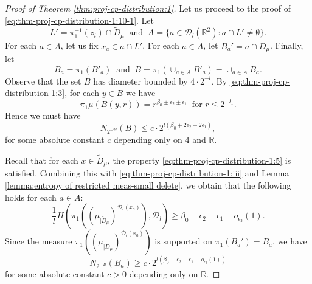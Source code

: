 \documentclass[10pt,a4paper]{amsart}
\def\D{\mathcal{D}}
\def\R{\mathbb R}
\begin{document}
\begin{proof}[Proof of Theorem \ref{thm:proj-cp-distribution:1}]
Let us proceed to the proof of \eqref{eq:thm-proj-cp-distribution-1:10-1}. Let 
\[L'=\pi_1^{-1}(z_i)\cap \tilde{D}_\mu\ \textrm{ and } \ A=\{a\in \D_l(\R^2): a\cap L'\neq \emptyset\}.\]
For each $a\in A$, let us fix $x_a\in a\cap L'$.   For each $a\in A$, let $B_a'=a\cap \tilde{D}_\mu$.  Finally, let 
\[B_a=\pi_1 (B'_a) \ \textrm{ and } \  B=\pi_1(\cup_{a\in A}B'_a)=\cup_{a\in A}B_a.\]
Observe that the set $B$ has diameter bounded by $4\cdot 2^{-l}$.  By  \eqref{eq:thm-proj-cp-distribution-1:3},  for each $y\in B$ we have
\[
\pi_1\mu(B(y,  r)) = r^{\beta_0\pm\epsilon_2\pm\epsilon_1} \  \textrm{ for } r\le 2^{-l_1}.
\]
Hence we must have 
\begin{equation}\label{eq:thm-proj-cp-distribution-1:11}
N_{2^{-2l}}(B) \le  c \cdot  2^{l(\beta_0+2\epsilon_2+2 \epsilon_1)},
\end{equation}
for some absolute constant $c$ depending only on $4$ and $\R$.  

Recall that for each $x\in \tilde{D}_\mu$,  the property \eqref{eq:thm-proj-cp-distribution-1:5} is satisfied.  Combining this with  \eqref{eq:thm-proj-cp-distribution-1:iii} and Lemma \ref{lemma:entropy of restricted meas-small delete},  we obtain that the following holds for each $a\in A$:
\[
\frac{1}{l}H\left(\pi_1\left(\left(\mu_{|\tilde{D}_\mu}\right)^{\D_l(x_a)}\right),  \D_l\right)\ge \beta_0-\epsilon_2- \epsilon_1-o_{\epsilon_3}(1). 
\]
Since the measure $\pi_1\left(\left(\mu_{|\tilde{D}_\mu}\right)^{\D_l(x_a)}\right)$ is supported on $\pi_1(B_a')=B_a$, we have
\begin{equation}\label{eq:thm-proj-cp-distribution-1:12}
N_{2^{-2l}}(B_a) \ge   c \cdot  2^{l(\beta_0-\epsilon_2- \epsilon_1-o_{\epsilon_3}(1))}
\end{equation}
for some absolute constant $c>0$ depending only on $\R$.


\end{proof}
\end{document}
